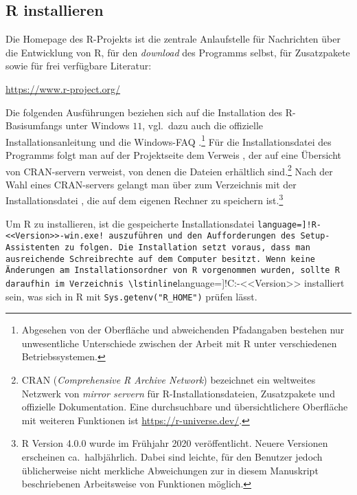 \subsection{R installieren}

Die Homepage des R-Projekts ist die zentrale Anlaufstelle für Nachrichten über die Entwicklung von R, für den \emph{download} des Programms selbst, für Zusatzpakete sowie für frei verfügbare Literatur:

\url{https://www.r-project.org/}

Die folgenden Ausführungen beziehen sich auf die Installation des R-Basisumfangs unter Windows $11$, vgl.\ dazu auch die offizielle Installationsanleitung \cite{RDevelopmentCoreTeam2008a} und die Windows-FAQ \cite{Ripley2008}.\footnote{Abgesehen von der Oberfläche und abweichenden Pfadangaben bestehen nur unwesentliche Unterschiede zwischen der Arbeit mit R unter verschiedenen Betriebssystemen.} Für die Installationsdatei des Programms folgt man auf der Projektseite dem Verweis , der auf eine Übersicht von CRAN-servern verweist, von denen die Dateien erhältlich sind.\footnote{CRAN (\emph{Comprehensive R Archive Network}) bezeichnet ein weltweites Netzwerk von \emph{mirror servern} für R-Installationsdateien, Zusatzpakete und offizielle Dokumentation. Eine durchsuchbare und übersichtlichere Oberfläche mit weiteren Funktionen ist \url{https://r-universe.dev/}.} Nach der Wahl eines CRAN-servers gelangt man über  zum Verzeichnis mit der Installationsdatei , die auf dem eigenen Rechner zu speichern ist.\footnote{R Version 4.0.0 wurde im Frühjahr 2020 veröffentlicht. Neuere Versionen erscheinen ca.\ halbjährlich. Dabei sind leichte, für den Benutzer jedoch üblicherweise nicht merkliche Abweichungen zur in diesem Manuskript beschriebenen Arbeitsweise von Funktionen möglich.}

Um R zu installieren, ist die gespeicherte Installationsdatei \lstinline[language=]!R-<<Version>>-win.exe! auszuführen und den Aufforderungen des Setup-Assistenten zu folgen. Die Installation setzt voraus, dass man ausreichende Schreibrechte auf dem Computer besitzt. Wenn keine Änderungen am Installationsordner von R vorgenommen wurden, sollte R daraufhin im Verzeichnis \lstinline[language=]!C:\Programme\R-<<Version>>\! installiert sein, was sich in R mit \lstinline!Sys.getenv("R_HOME")! prüfen lässt.

